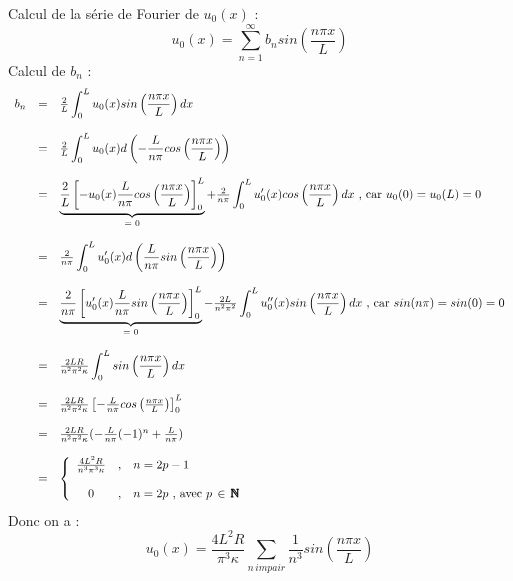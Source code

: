 \documentclass[a4paper,12pt]{report}
\begin{document}
Calcul de la s\'erie de Fourier de $u_{0}(x)$ :
\begin{equation}
u_{0}(x)=\sum_{n=1}^{\infty}b_{n}sin(\frac{n\pi x}{L})
\end{equation}
Calcul de $b_{n}$ :
\[ 
  \begin{array}{l c l}
  b_{n} &=& \frac{2}{L}\displaystyle\int_{0}^{L}u_{0}(x)sin\left(\frac{n\pi x}{L}\right)dx\\\\
  &=& \frac{2}{L}\displaystyle\int_{0}^{L}u_{0}(x)d\left(-\frac{L}{n\pi}cos\left(\frac{n\pi x}{L}\right)\right)\\\\
  &=& \underbrace{\frac{2}{L}\left[-u_{0}(x)\frac{L}{n\pi}cos\left(\frac{n\pi x}{L}\right)\right]_{0}^{L}}_{\text{= 0}} + \frac{2}{n\pi}\displaystyle\int_{0}^{L}u'_{0}(x)cos\left(\frac{n\pi x}{L}\right)dx\text{ , car }u_{0}(0) = u_{0}(L) = 0\\\\
  &=& \frac{2}{n\pi}\displaystyle\int_{0}^{L}u'_{0}(x)d\left(\frac{L}{n\pi}sin\left(\frac{n\pi x}{L}\right)\right)\\\\
  &=& \underbrace{\frac{2}{n\pi}\left[u'_{0}(x)\frac{L}{n\pi}sin\left(\frac{n\pi x}{L}\right)\right]_{0}^{L}}_{\text{= 0}} - \frac{2L}{n^{2}\pi^{2}}\displaystyle\int_{0}^{L}u''_{0}(x)sin\left(\frac{n\pi x}{L}\right)dx\text{ , car }sin(n\pi)=sin(0) = 0\\\\
  &=& \frac{2LR}{n^{2}\pi^{2}\kappa}\displaystyle\int_{0}^{L}sin\left(\frac{n\pi x}{L}\right)dx\\\\
  &=& \frac{2LR}{n^{2}\pi^{2}\kappa}\left[-\frac{L}{n\pi}cos\left(\frac{n\pi x}{L}\right)\right]_{0}^{L}\\\\
  &=& \frac{2LR}{n^{2}\pi^{2}\kappa}(-\frac{L}{n\pi}(-1)^{n}+\frac{L}{n\pi})\\\\
  &=& \left\{
  \begin{array}{c c l}
  \frac{4L^{2}R}{n^{3}\pi^{3}\kappa} &,& n=2p-1\\\\
  0 &,& n=2p\text{ , avec }p\,\in\,\pmb{\mathbb{N}}\\
  \end{array}
\right.
  \end{array}
\]
Donc on a :
\begin{equation}
u_{0}(x)=\frac{4L^{2}R}{\pi^{3}\kappa}\sum_{n\,impair}\frac{1}{n^{3}}sin\left(\frac{n\pi x}{L}\right)
\end{equation}
\end{document}

